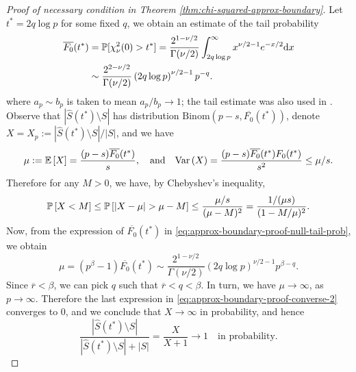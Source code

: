 \begin{proof}[Proof of necessary condition in Theorem \ref{thm:chi-squared-approx-boundary}]
Let $t^* = 2q\log{p}$ for some fixed $q$, we obtain an estimate of the tail probability
\begin{align}
    \overline{F_0}(t^*) 
    &= \P[\chi_\nu^2(0) > t^*] 
    = \frac{2^{1-\nu/2}}{\Gamma(\nu/2)} \int_{2q\log{p}}^\infty x^{\nu/2-1}e^{-x/2} \mathrm{d}x \nonumber \\
    &\sim \frac{2^{2-\nu/2}}{\Gamma(\nu/2)} \left(2q\log{p}\right)^{\nu/2-1}p^{-q}. \label{eq:approx-boundary-proof-null-tail-prob}
\end{align}
where $a_p\sim b_p$ is taken to mean $a_p/b_p\to 1$; the tail estimate was also used in \cite{donoho2004higher}.
Observe that $|\widehat{S}(t^*)\setminus{S}|$ has distribution $\text{Binom}(p-s, \overline{F_0}(t^*))$, denote $X = X_p := {|\widehat{S}(t^*)\setminus{S}|}/{|S|}$, and we have 
$$
\mu := {\mathbb E}\left[X\right] = \frac{(p-s)\overline{F_0}(t^*)}{s},
\quad \text{and} \quad
{\rm {Var}}\left(X\right) = \frac{(p-s)\overline{F_0}(t^*){F_0}(t^*)}{s^2} \le \mu/s.
$$
Therefore for any $M>0$, we have, by Chebyshev's inequality,
\begin{equation}
    \P\left[X < M\right] 
    \le \P\left[\left|X-\mu\right| > \mu - M\right]
    \le \frac{\mu/s}{(\mu-M)^2}
    = \frac{1/(\mu s)}{(1-M/\mu)^2}. \label{eq:approx-boundary-proof-converse-2}
\end{equation}
Now, from the expression of $\overline{F_0}(t^*)$ in \eqref{eq:approx-boundary-proof-null-tail-prob}, we obtain
$$
\mu = (p^\beta - 1)\overline{F_0}(t^*) \sim \frac{2^{1-\nu/2}}{\Gamma(\nu/2)} \left(2q\log{p}\right)^{\nu/2-1}p^{\beta-q}.
$$
Since $\overline{r}<\beta$, we can pick $q$ such that $\overline{r}<q<\beta$. 
In turn, we have $\mu \to\infty$, as $p\to\infty$.
Therefore the last expression in \eqref{eq:approx-boundary-proof-converse-2} converges to 0, and we conclude that $X\to\infty$ in probability, and hence
\begin{equation} \label{eq:approx-boundary-proof-converse-3}
\frac{|\widehat{S}(t^*)\setminus{S}|}{|\widehat{S}(t^*)\setminus{S}|+|{S}|} 
= \frac{X}{X+1} \to 1 \quad \text{in probability}.
\end{equation}


\end{proof}
